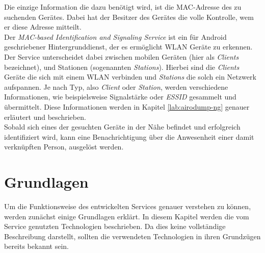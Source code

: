 \documentclass[]{report}
\begin{document}
Die einzige Information die dazu benötigt wird, ist die MAC-Adresse des zu suchenden Gerätes. Dabei hat der Besitzer des Gerätes die volle Kontrolle, wem er diese Adresse mitteilt. \\
Der \textit{MAC-based Identification and Signaling Service} ist ein für Android geschriebener Hintergrunddienst, der es ermöglicht WLAN Geräte zu erkennen. Der Service unterscheidet dabei zwischen mobilen Geräten (hier als \textit{Clients} bezeichnet), und Stationen (sogenannten \textit{Stations}). Hierbei sind die \textit{Clients} Geräte die sich mit einem WLAN verbinden und \textit{Stations} die solch ein Netzwerk aufspannen. Je nach Typ, also \textit{Client} oder \textit{Station}, werden verschiedene Informationen, wie beispielsweise Signalstärke oder \textit{ESSID} gesammelt und übermittelt. Diese Informationen werden in Kapitel \ref{lab:airodump-ng} genauer erläutert und beschrieben.\\
Sobald sich eines der gesuchten Geräte in der Nähe befindet und erfolgreich identifiziert wird, kann eine Benachrichtigung über die Anwesenheit einer damit verknüpften Person, ausgelöst werden.
\chapter{Grundlagen}
Um die Funktionsweise des entwickelten Services genauer verstehen zu können, werden zunächst einige Grundlagen erklärt. In diesem Kapitel werden die vom Service genutzten Technologien  beschrieben. Da dies keine vollständige Beschreibung darstellt, sollten die verwendeten Technologien in ihren Grundzügen bereits bekannt sein. 
\end{document}
